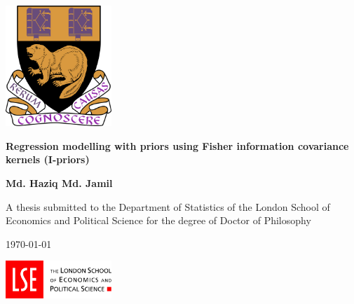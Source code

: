 \documentclass[a4paper,showframes]{report}
\begin{document}
\begin{titlepage}
  \singlespacing
  \begin{center}
    
    \vspace*{0.1cm}
     
    \includegraphics[width=0.3\textwidth]{figure/lse_coat_of_arms_1024}
    \vspace{2cm}
    
    \LARGE
    {\textbf{Regression modelling with priors using Fisher information covariance kernels (I-priors)}}
    \vspace{1.5cm}
    
    \Large 
    \textbf{Md. Haziq Md. Jamil}
    \vfill
    
    \normalsize
    A thesis submitted to the Department of Statistics of the London School of Economics and Political Science for the degree of    Doctor of Philosophy
    \vspace{1cm}
    
    \UKvardate
    \today
    \vspace{1cm}
    
    \includegraphics[width=0.3\textwidth]{figure/lse_logo_1024}
  
  \end{center}
\end{titlepage}
\end{document}
